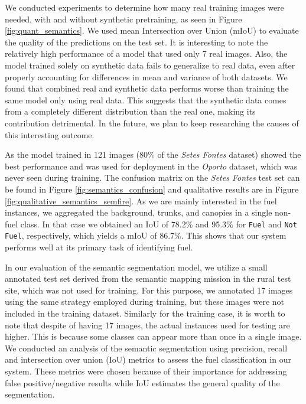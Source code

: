 We conducted experiments to determine how many real training images were needed, with and without synthetic pretraining, as seen in Figure \ref{fig:quant_semantics}. We used mean Intersection over Union (mIoU) to evaluate the quality of the predictions on the test set. It is interesting to note the relatively high performance of a model that used only 7 real images. Also, the model trained solely on synthetic data fails to generalize to real data, even after properly accounting for differences in mean and variance of both datasets. We found that combined real and synthetic data performs worse than training the same model only using real data. This suggests that the synthetic data comes from a completely different distribution than the real one, making its contribution detrimental. In the future, we plan to keep researching the causes of this interesting outcome.

As the model trained in 121 images ($80\%$ of the \textit{Setes Fontes} dataset) showed the best performance and was used for deployment in the \textit{Oporto} dataset, which was never seen during training.
The confusion matrix on the \textit{Setes Fontes} test set can be found in Figure \ref{fig:semantics_confusion} and qualitative results are in Figure \ref{fig:qualitative_semantics_semfire}. As we are mainly interested in the fuel instances, we aggregated the background, trunks, and canopies in a single non-fuel class. In that case we obtained an IoU of 78.2\% and 95.3\% for \texttt{Fuel} and \texttt{Not Fuel}, respectively, which yields a mIoU of 86.7\%. This shows that our system performs well at its primary task of identifying fuel.





In our evaluation of the semantic segmentation model, we utilize a small annotated test set derived from the semantic mapping mission in the rural test site, which was not used for training. For this purpose, we annotated 17 images using the same strategy employed during training, but these images were not included in the training dataset. Similarly for the training case, it is worth to note that despite of having 17 images, the actual instances used for testing are higher. This is because some classes can appear more than once in a single image. We conducted an analysis of the semantic segmentation using precision, recall and intersection over union (IoU) metrics to assess the fuel classification in our system. These metrics were chosen because of their importance for addressing false positive/negative results while IoU estimates the general quality of the segmentation. 

